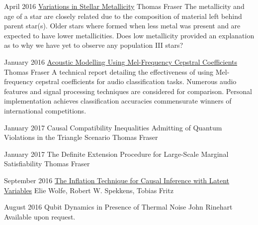 \documentclass{article}
\begin{document}
        {
            \begin{paperlist}
                \item{April 2016}
                {\href{https://github.com/tcfraser/tcfraser.github.io/raw/master/documents/stellar_metallicity.pdf}{Variations in Stellar Metallicity}}
                {Thomas Fraser}
                {The metallicity and age of a star are closely related due to the composition of material left behind parent star(s). Older stars where formed when less metal was present and are expected to have lower metallicities. Does low metallicity provided an explanation as to why we have yet to observe any population III stars?}
                \item{January 2016}
                {\href{https://github.com/tcfraser/tcfraser.github.io/raw/master/documents/mfcc.pdf}{Acoustic Modelling Using Mel-Frequency Cepstral Coefficients}}
                {Thomas Fraser}
                {A technical report detailing the effectiveness of using Mel-frequency cepstral coefficients for audio classification tasks. Numerous audio features and signal processing techniques are considered for comparison. Personal implementation achieves classification accuracies commensurate winners of international competitions.}
            \end{paperlist}
        }
        {
            \begin{paperlist}
                \item{January 2017}
                {Causal Compatibility Inequalities Admitting of Quantum Violations in the Triangle Scenario}
                {Thomas Fraser}
                {}
                \item{January 2017}
                {The Definite Extension Procedure for Large-Scale Marginal Satisfiability}
                {Thomas Fraser}
                {}
            \end{paperlist}
        }

        {
            \begin{paperlist}
                \item{September 2016}
                {\href{https://arxiv.org/abs/1609.00672}{The Inflation Technique for Causal Inference with Latent Variables}}
                {Elie Wolfe, Robert W. Spekkens, Tobias Fritz}
                {}
                \item{August 2016}
                {Qubit Dynamics in Presence of Thermal Noise}
                {John Rinehart}
                { Available upon request.}
            \end{paperlist}
        }
\end{document}
